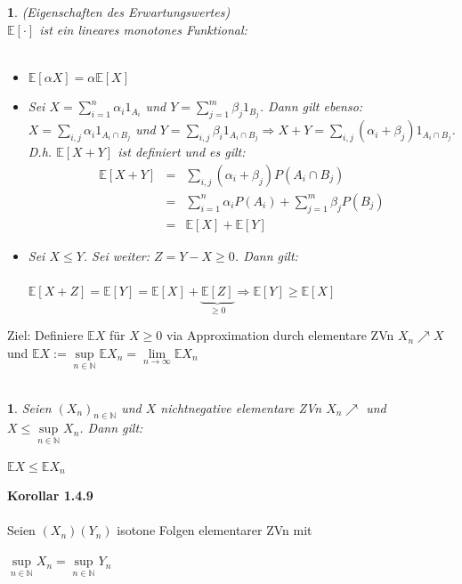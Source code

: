 \documentclass[10pt,a4paper]{report}
\numberwithin{equation}{section}
\numberwithin{figure}{section}
\theoremstyle{plain}
\theoremstyle{definition}
\theoremstyle{plain}
\newtheorem{prop}{\protect\propositionname}[section]
\theoremstyle{definition}
\theoremstyle{remark}
\theoremstyle{plain}
\newtheorem{lem}{\protect\lemmaname}[section]
\theoremstyle{plain}
\theoremstyle{plain}
\theoremstyle{plain}
\theoremstyle{plain}
\providecommand{\lemmaname}{Lemma}
\providecommand{\propositionname}{Satz}
\newcommand{\1}{ \mathbb{1} } %
\begin{document}
\begin{prop}
(Eigenschaften des Erwartungswertes)\\
  $\mathbb{E}[\cdot]$ ist ein lineares monotones Funktional:\\\\
  \begin{itemize}
  \item $\mathbb{E}[\alpha X]=\alpha \mathbb{E}[X]$
  \item Sei $X=\sum\limits_{i=1}^n\alpha_i 1_{A_i}$ und
    $Y=\sum\limits_{j=1}^m\beta_j1_{B_j}$. Dann gilt ebenso:
    $X=\sum\limits_{i,j}\alpha_i1_{A_i\cap B_j}$ und
    $Y=\sum\limits_{i,j}\beta_i1_{A_i\cap B_j} \Rightarrow
    X+Y=\sum\limits_{i,j}(\alpha_i+\beta_j)1_{A_i\cap
      B_j}$. D.h. $\mathbb{E}[X+Y]$ ist definiert und es gilt:
    \begin{eqnarray*}
      \mathbb{E}[X+Y]&=& \sum\limits_{i,j}(\alpha_i+\beta_j)P(A_i\cap B_j)\\
      &=&\sum\limits_{i=1}^n\alpha_i P(A_i)+\sum\limits_{j=1}^m\beta_jP(B_j)\\
      &=&\mathbb{E}[X]+\mathbb{E}[Y]
    \end{eqnarray*} 
  \item Sei $X\leq Y$. Sei weiter: $Z=Y-X\geq 0$. Dann gilt:\\\\
    $\mathbb{E}[X+Z]=\mathbb{E}[Y]=\mathbb{E}[X]+\underbrace{\mathbb{E}[Z]}_{\geq
      0} \Rightarrow \mathbb{E}[Y]\geq \mathbb{E}[X]$
  \end{itemize}
\end{prop}
Ziel: Definiere $\mathbb{E}X$ für $X\geq 0$ via Approximation durch elementare ZVn $X_n\nearrow X$ und $\mathbb{E}X:=\sup\limits_{n\in \mathbb{N}}\mathbb{E}X_n=\lim\limits_{n\to \infty} \mathbb{E}X_n$\\\\
\begin{lem}
  Seien $(X_n)_{n\in \mathbb{N}}$ und $X$ nichtnegative elementare ZVn
  $X_n\nearrow$ und $X\leq \sup\limits_{n\in \mathbb{N}} X_n$. Dann
  gilt:
  \begin{center}
    $\mathbb{E}X\leq \mathbb{E}X_n$
  \end{center}
\end{lem}
\textbf{Korollar 1.4.9}\\\\
Seien $(X_n)(Y_n)$ isotone Folgen elementarer ZVn mit 
\begin{center}
$\sup\limits_{n\in \mathbb{N}} X_n=\sup\limits_{n\in \mathbb{N}} Y_n$
\end{center}
\end{document}
